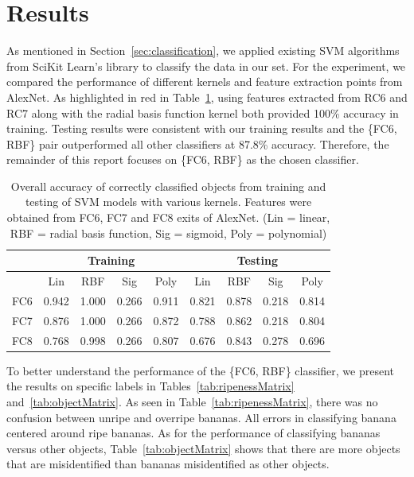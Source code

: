\documentclass{article} %
\begin{document}
 \section{Results}
 \label{sec:results}
As mentioned in Section~\ref{sec:classification}, we applied existing SVM algorithms from SciKit Learn's library to classify the data in our set. For the experiment, we compared the performance of different kernels and feature extraction points from AlexNet. As highlighted in red in Table~\ref{tab:core}, using features extracted from RC6 and RC7 along with the radial basis function kernel both 
provided 100\% accuracy in training. Testing results were consistent with our training results and the \{FC6, RBF\} pair outperformed all other classifiers at 87.8\% accuracy. Therefore, the remainder of this report focuses on \{FC6, RBF\} as the chosen classifier. 

\begin{table}[h]
\caption{Overall accuracy of correctly classified objects from training and testing of SVM models with various kernels. Features were obtained from FC6, FC7 and FC8 exits of AlexNet. (Lin = linear, RBF = radial basis function, Sig = sigmoid, Poly = polynomial)}
\label{tab:core}
\centering
\begin{tabular}{|c|c|c|c|c|c|c|c|c|}\hline
 &  \multicolumn{4}{c|}{Training} & \multicolumn{4}{c|}{Testing}\\\hline
&Lin& RBF&Sig&Poly&Lin& RBF&Sig&Poly\\\hline
FC6&0.942&\cellcolor{SFUred!25}1.000&0.266&0.911&0.821&\cellcolor{SFUred!25}0.878&0.218&0.814\\\hline
FC7&0.876&\cellcolor{SFUred!25}1.000&0.266&0.872&0.788&0.862&0.218&0.804\\\hline
FC8&0.768&0.998&0.266&0.807&0.676&0.843&0.278&0.696\\\hline
\end{tabular}
\end{table}

To better understand the performance of the \{FC6, RBF\} classifier, we present the results on specific labels in Tables~\ref{tab:ripenessMatrix} and~\ref{tab:objectMatrix}. As seen in Table~\ref{tab:ripenessMatrix}, there was no confusion between unripe and overripe bananas. All errors in classifying banana centered around ripe bananas. As for the performance of classifying bananas versus other objects, Table~\ref{tab:objectMatrix} shows that there are more objects that are misidentified than bananas misidentified as other objects. 
\end{document}
